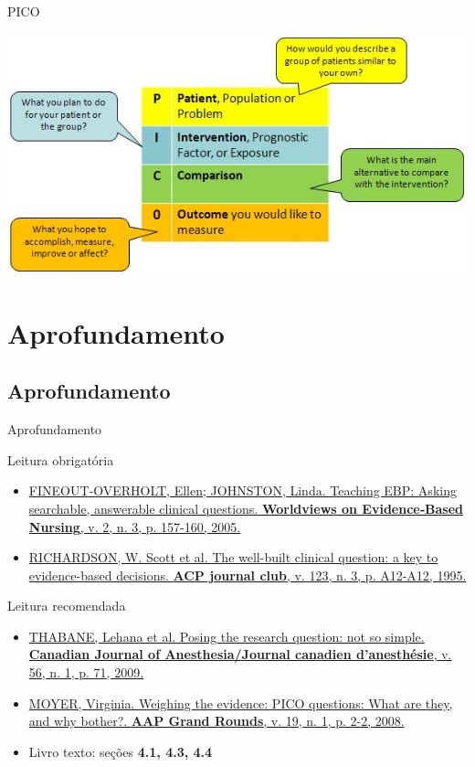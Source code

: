 \documentclass{beamer}
\begin{document}
\begin{frame}{PICO}
  \begin{center}
    \includegraphics[height=0.8\textheight]{Hipoteses_variaveis/pico}
  \end{center}
\end{frame}

\section{Aprofundamento}

\subsection{Aprofundamento}

\begin{frame}{Aprofundamento}
  \begin{block}{Leitura obrigatória}
    \begin{itemize}
      \scriptsize
    \item \href{https://doi.org/10.1111/j.1741-6787.2005.00032.x}
      {FINEOUT‐OVERHOLT, Ellen; JOHNSTON, Linda. Teaching EBP: Asking
        searchable, answerable clinical questions. {\bf Worldviews on
          Evidence‐Based Nursing}, v. 2, n. 3, p. 157-160, 2005.}
    \item
      \href{https://acpjc.acponline.org/Content/123/3/issue/ACPJC-1995-123-3-A12.htm}
      {RICHARDSON, W. Scott et al. The well-built clinical question: a
        key to evidence-based decisions. {\bf ACP journal club},
        v. 123, n. 3, p. A12-A12, 1995.}
    \end{itemize}
  \end{block}
  \begin{block}{Leitura recomendada}
    \begin{itemize}
      \tiny
    \item \href{https://doi.org/10.1007/s12630-008-9007-4}
      {THABANE, Lehana et al. Posing the research question: not so
        simple. {\bf Canadian Journal of Anesthesia/Journal canadien
          d'anesthésie}, v. 56, n. 1, p. 71, 2009.}
    \item \href{https://doi.org/10.1542/gr.19-1-2}
      {MOYER, Virginia. Weighing the evidence: PICO questions: What
        are they, and why bother?. {\bf AAP Grand Rounds}, v. 19,
        n. 1, p. 2-2, 2008.}  \scriptsize
    \item Livro texto: seções {\bf 4.1, 4.3, 4.4}
    \end{itemize}
  \end{block}
\end{frame}
\end{document}

